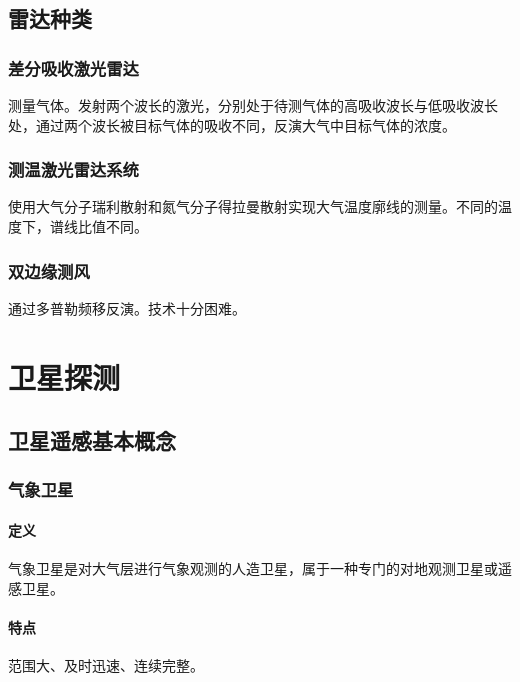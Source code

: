 \documentclass[UTF8,11pt]{ctexbook}
\begin{document}
\section{雷达种类}


\subsection{差分吸收激光雷达}

测量气体。发射两个波长的激光，分别处于待测气体的高吸收波长与低吸收波长处，通过两个波长被目标气体的吸收不同，反演大气中目标气体的浓度。

\subsection{测温激光雷达系统}

使用大气分子瑞利散射和氮气分子得拉曼散射实现大气温度廓线的测量。不同的温度下，谱线比值不同。

\subsection{双边缘测风}

通过多普勒频移反演。技术十分困难。

\chapter{卫星探测}

\section{卫星遥感基本概念}

\subsection{气象卫星}

\subsubsection{定义}

气象卫星是对大气层进行气象观测的人造卫星，属于一种专门的对地观测卫星或遥感卫星。

\subsubsection{特点}

范围大、及时迅速、连续完整。
\end{document}
